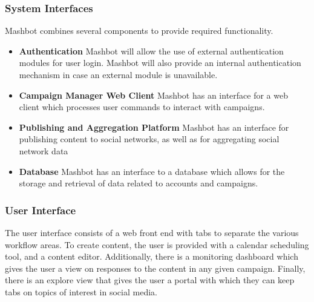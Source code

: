 \documentclass{report}
\begin{document}
\subsubsection{System Interfaces} %
  Mashbot combines several components to provide required functionality.
			\begin{itemize}
				\item \textbf{Authentication} Mashbot
                                  will allow the use of external
                                  authentication modules for user
                                  login. Mashbot will also provide an
                                  internal authentication mechanism in
                                  case an external module is
                                  unavailable.
				\item \textbf{Campaign Manager Web
                                  Client} Mashbot has an interface for
                                  a web client which processes user
                                  commands to interact with campaigns.
				\item \textbf{Publishing and
                                  Aggregation Platform} Mashbot has an
                                  interface for publishing content to
                                  social networks, as well as for
                                  aggregating social network data
				\item \textbf{Database} Mashbot has an
                                  interface to a database which allows
                                  for the storage and retrieval of
                                  data related to accounts and
                                  campaigns.
			\end{itemize}
		\subsubsection{User Interface} %
                The user interface consists of a web front end with
                tabs to separate the various workflow areas. To create
                content, the user is provided with a calendar
                scheduling tool, and a content editor.  Additionally,
                there is a monitoring dashboard which gives the user a
                view on responses to the content in any given
                campaign.  Finally, there is an explore view that
                gives the user a portal with which they can keep tabs
                on topics of interest in social media.
\end{document}
